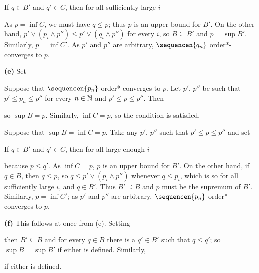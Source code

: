 {\noindent If $q\in B'$ and $q'\in C$, then for all sufficiently large
$i$
     
     
\noindent As $p=\inf C$, we must have $q\le p$;  thus $p$ is an upper
bound for $B'$.   On the other hand,
$p'\vee(p_i\wedge p'')\le p'\vee(q_i\wedge p'')$ for every $i$, so
$B\subseteq B'$ and $p=\sup B'$.
Similarly, $p=\inf C'$.   As $p'$ and $p''$ are arbitrary,
$\sequencen{q_n}$ order*-converges to $p$.
     
\medskip
     
{\bf (e)} Set
     
     
     
\medskip
     
 Suppose that $\sequencen{p_n}$ order*-converges to
$p$.   Let $p'$, $p''$ be such that $p'\le p_n\le p''$ for every
$n\in\Bbb N$ and $p'\le p\le p''$.   Then
     
     
\noindent so $\sup B=p$.   Similarly, $\inf C=p$, so the condition is
satisfied.
     
\medskip
     
 Suppose that $\sup B=\inf C=p$.   Take any $p'$, $p''$
such that $p'\le p\le p''$ and set
     
     
     
\noindent If $q\in B'$ and $q'\in C$, then for all large enough $i$
     
     
\noindent because $p\le q'$.   As $\inf C=p$, $p$ is an upper bound for
$B'$.   On the other hand,
if $q\in B$, then $q\le p$, so $q\le p'\vee(p_i\wedge p'')$ whenever
$q\le p_i$, which is so for all sufficiently large $i$, and $q\in B'$.
Thus $B'\supseteq B$ and $p$ must be the supremum of $B'$.   Similarly,
$p=\inf C'$;  as $p'$ and $p''$ are arbitrary, $\sequencen{p_n}$
order*-converges to $p$.
     
\medskip
     
{\bf (f)} This follows at once from (e).   Setting
     
     
\noindent then $B'\subseteq B$ and for every $q\in B$ there is a $q'\in
B'$ such that $q\le q'$;  so $\sup B=\sup B'$ if either is defined.
Similarly,
     
     
\noindent if either is defined.
}%
     
